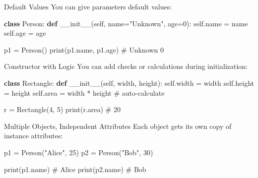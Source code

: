 \documentclass[
  letterpaper,
  DIV=11,
  numbers=noendperiod]{scrreprt}
\newenvironment{Shaded}{\begin{snugshade}}{\end{snugshade}}
\newcommand{\BuiltInTok}[1]{\textcolor[rgb]{0.00,0.23,0.31}{#1}}
\newcommand{\CommentTok}[1]{\textcolor[rgb]{0.37,0.37,0.37}{#1}}
\newcommand{\DecValTok}[1]{\textcolor[rgb]{0.68,0.00,0.00}{#1}}
\newcommand{\FunctionTok}[1]{\textcolor[rgb]{0.28,0.35,0.67}{#1}}
\newcommand{\KeywordTok}[1]{\textcolor[rgb]{0.00,0.23,0.31}{\textbf{#1}}}
\newcommand{\NormalTok}[1]{\textcolor[rgb]{0.00,0.23,0.31}{#1}}
\newcommand{\OperatorTok}[1]{\textcolor[rgb]{0.37,0.37,0.37}{#1}}
\newcommand{\StringTok}[1]{\textcolor[rgb]{0.13,0.47,0.30}{#1}}
\newcommand{\VariableTok}[1]{\textcolor[rgb]{0.07,0.07,0.07}{#1}}
\begin{document}
Default Values You can give parameters default values:

\begin{Shaded}
\begin{Highlighting}[]
\KeywordTok{class}\NormalTok{ Person:}
    \KeywordTok{def} \FunctionTok{\_\_init\_\_}\NormalTok{(}\VariableTok{self}\NormalTok{, name}\OperatorTok{=}\StringTok{"Unknown"}\NormalTok{, age}\OperatorTok{=}\DecValTok{0}\NormalTok{):}
        \VariableTok{self}\NormalTok{.name }\OperatorTok{=}\NormalTok{ name}
        \VariableTok{self}\NormalTok{.age }\OperatorTok{=}\NormalTok{ age}

\NormalTok{p1 }\OperatorTok{=}\NormalTok{ Person()}
\BuiltInTok{print}\NormalTok{(p1.name, p1.age)   }\CommentTok{\# Unknown 0}
\end{Highlighting}
\end{Shaded}

Constructor with Logic You can add checks or calculations during
initialization:

\begin{Shaded}
\begin{Highlighting}[]
\KeywordTok{class}\NormalTok{ Rectangle:}
    \KeywordTok{def} \FunctionTok{\_\_init\_\_}\NormalTok{(}\VariableTok{self}\NormalTok{, width, height):}
        \VariableTok{self}\NormalTok{.width }\OperatorTok{=}\NormalTok{ width}
        \VariableTok{self}\NormalTok{.height }\OperatorTok{=}\NormalTok{ height}
        \VariableTok{self}\NormalTok{.area }\OperatorTok{=}\NormalTok{ width }\OperatorTok{*}\NormalTok{ height   }\CommentTok{\# auto{-}calculate}

\NormalTok{r }\OperatorTok{=}\NormalTok{ Rectangle(}\DecValTok{4}\NormalTok{, }\DecValTok{5}\NormalTok{)}
\BuiltInTok{print}\NormalTok{(r.area)   }\CommentTok{\# 20}
\end{Highlighting}
\end{Shaded}

Multiple Objects, Independent Attributes Each object gets its own copy
of instance attributes:

\begin{Shaded}
\begin{Highlighting}[]
\NormalTok{p1 }\OperatorTok{=}\NormalTok{ Person(}\StringTok{"Alice"}\NormalTok{, }\DecValTok{25}\NormalTok{)}
\NormalTok{p2 }\OperatorTok{=}\NormalTok{ Person(}\StringTok{"Bob"}\NormalTok{, }\DecValTok{30}\NormalTok{)}

\BuiltInTok{print}\NormalTok{(p1.name)   }\CommentTok{\# Alice}
\BuiltInTok{print}\NormalTok{(p2.name)   }\CommentTok{\# Bob}
\end{Highlighting}
\end{Shaded}
\end{document}
